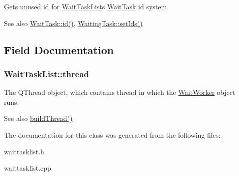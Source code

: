 Gets unused id for \hyperlink{class_wait_task_list}{Wait\+Task\+List}\textquotesingle{}s \hyperlink{class_wait_task}{Wait\+Task} id system. 

\begin{DoxySeeAlso}{See also}
\hyperlink{class_wait_task_a060f5d982d06d90546ca7a23518d09e0}{Wait\+Task\+::id()}, \hyperlink{class_waiting_task_a5123ece4b96ec9229d01d28db64094fa}{Waiting\+Task\+::set\+Ids()} 
\end{DoxySeeAlso}


\subsection{Field Documentation}
\hypertarget{class_wait_task_list_a853a1390df826723ab93a21b06cb6c30}{}
\subsubsection[{thread}]{\setlength{\rightskip}{0pt plus 5cm}Wait\+Task\+List\+::thread\hspace{0.3cm}{\ttfamily [private]}}\label{class_wait_task_list_a853a1390df826723ab93a21b06cb6c30}


The Q\+Thread object, which contains thread in which the \hyperlink{class_wait_worker}{Wait\+Worker} object runs. 

\begin{DoxySeeAlso}{See also}
\hyperlink{class_wait_task_list_ad912d65f84926ef852531a261d9e33f4}{build\+Thread()} 
\end{DoxySeeAlso}


The documentation for this class was generated from the following files\+:\begin{DoxyCompactItemize}
\item 
waittasklist.\+h\item 
waittasklist.\+cpp\end{DoxyCompactItemize}
